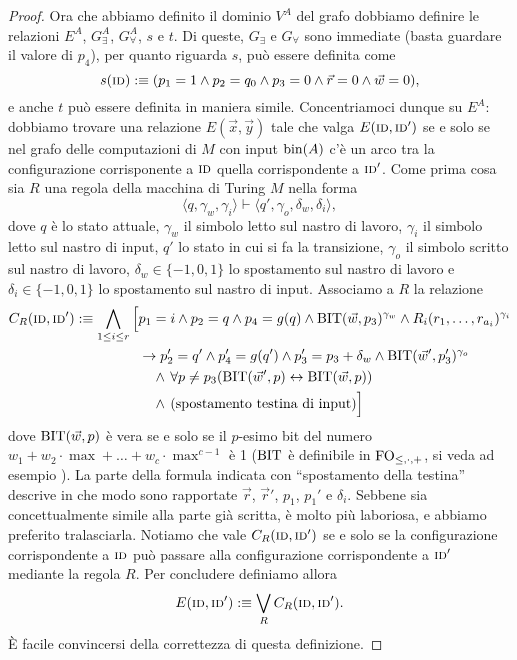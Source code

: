 \begin{proof}
  Ora che abbiamo definito il dominio $V^A$ del grafo dobbiamo definire le
  relazioni $E^A$, $G_\exists^A$, $G_\forall^A$, $s$ e $t$. Di queste, $G_\exists$
  e $G_\forall$ sono immediate
  (basta guardare il valore di $p_4$), per quanto riguarda $s$, può essere
  definita come
  \[s(\textsc{id}) :\equiv (p_1=1 \land p_2 = q_0 \land p_3=0 \land \vec{r}=0 \land \vec{w}=0),\]
  e anche $t$ può essere definita in maniera simile.
  Concentriamoci dunque su $E^A$: dobbiamo
  trovare una relazione $E(\vec{x},\vec{y})$ tale che
  valga $E(\textsc{id}, \textsc{id}')$ se e solo se nel grafo delle
  computazioni di $M$ con input $\operatorname{bin}(A)$ c'è un arco tra la configurazione
  corrisponente a $\textsc{id}$ quella corrispondente a $\textsc{id}'$.
  Come prima cosa sia $R$ una regola della macchina di Turing $M$ nella forma
  \[\langle q, \gamma_w, \gamma_i \rangle \vdash
   \langle q', \gamma_o, \delta_w, \delta_i \rangle,
  \] dove $q$ è lo stato attuale, $\gamma_w$ il simbolo letto sul nastro di lavoro,
  $\gamma_i$ il simbolo letto sul nastro di input, $q'$ lo stato in cui si fa la transizione,
  $\gamma_o$ il simbolo scritto sul nastro di lavoro,
  $\delta_w \in \{-1,0,1\}$ lo spostamento sul nastro di lavoro e $\delta_i \in \{-1,0,1\}$
  lo spostamento sul nastro di input.
  Associamo a $R$ la relazione
  \begin{align*}
  C_R(\textsc{id}, \textsc{id}') :\equiv  \bigwedge_{1 \leq i \leq r} \Big[ & p_1=i \land p_2=q \land p_4=g(q)
    \land \operatorname{BIT}(\vec{w},p_3)^{\gamma_w} \land R_i(r_1,\ldots,r_{a_i})^{\gamma_i} \\
    & \rightarrow p_2'=q' \land p_4'=g(q') \land p_3'=p_3 + \delta_w \land
    \operatorname{BIT}(\vec{w}', p_3')^{\gamma_o} \\
    & \phantom{\rightarrow} \land \, \forall p \neq p_3 (\operatorname{BIT}(\vec{w}',p) \leftrightarrow \operatorname{BIT}(\vec{w},p))\\
    & \phantom{\rightarrow} \land \, (\text{spostamento testina di input})
    \Big]
  \end{align*}
  dove $\operatorname{BIT}(\vec{w},p)$ è vera se e solo se il $p$-esimo bit del numero
  $w_1 + w_2 \cdot \max + \ldots + w_c \cdot \max^{c-1}$ è 1 ($\operatorname{BIT}$ è definibile
  in $\operatorname{FO}_{\leq,\cdot,+}$, si veda ad esempio \cite[1.17]{immerman1999descriptive}).
  La parte della formula indicata con ``spostamento della testina'' descrive in
  che modo sono rapportate $\vec{r}$, $\vec{r}'$, $p_1$, $p_1'$ e $\delta_i$.
  Sebbene sia concettualmente
  simile alla parte già scritta, è molto più laboriosa, e abbiamo preferito tralasciarla.
  Notiamo che vale $C_R(\textsc{id}, \textsc{id}')$ se e solo se la configurazione corrispondente
  a $\textsc{id}$ può passare alla configurazione corrispondente a $\textsc{id}'$ mediante la regola
  $R$. Per concludere definiamo allora
  \[ E(\textsc{id}, \textsc{id}') :\equiv \bigvee_R C_R(\textsc{id}, \textsc{id}'). \]
  \`E facile convincersi della correttezza di questa definizione.
\end{proof}

